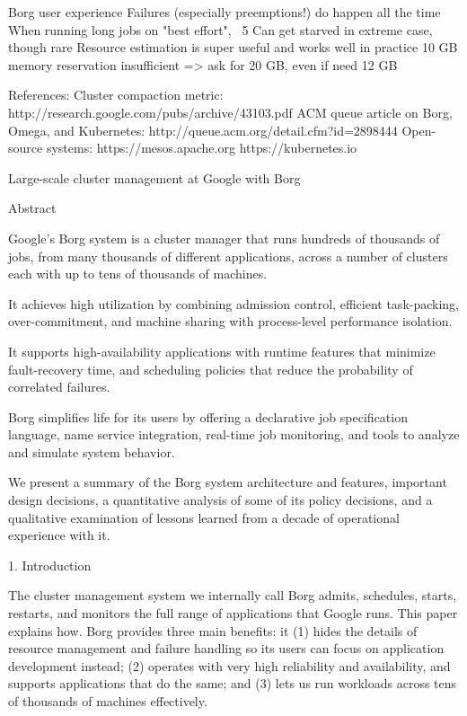 Borg user experience
  Failures (especially preemptions!) do happen all the time
    When running long jobs on "best effort", ~5%
    Can get starved in extreme case, though rare
  Resource estimation is super useful and works well in practice
    10 GB memory reservation insufficient => ask for 20 GB, even if need 12 GB


References:
  Cluster compaction metric: http://research.google.com/pubs/archive/43103.pdf
  ACM queue article on Borg, Omega, and Kubernetes:
    http://queue.acm.org/detail.cfm?id=2898444
  Open-source systems:
    https://mesos.apache.org
    https://kubernetes.io

Large-scale cluster management at Google with Borg

Abstract

Google’s Borg system is a cluster manager that runs hundreds of thousands of
jobs, from many thousands of different applications, across a number of
clusters each with up to tens of thousands of machines.

It achieves high utilization by combining admission control, efficient
task-packing, over-commitment, and machine sharing with process-level
performance isolation. 

It supports high-availability applications with runtime features that minimize
fault-recovery time, and scheduling policies that reduce the probability of
correlated failures. 

Borg simplifies life for its users by offering a declarative job
specification language, name service integration, real-time job monitoring,
and tools to analyze and simulate system behavior.

We present a summary of the Borg system architecture and features, important
design decisions, a quantitative analysis of some of its policy decisions, and
a qualitative examination of lessons learned from a decade of operational
experience with it.

1. Introduction

The cluster management system we internally call Borg admits, schedules, starts,
restarts, and monitors the full range of applications that Google runs.
This paper explains how. Borg provides three main benefits: it (1) hides the
details of resource management and failure handling so its users can focus on
application development instead; (2) operates with very high reliability and
availability, and supports applications that do the same; and (3) lets us run
workloads across tens of thousands of machines effectively.

